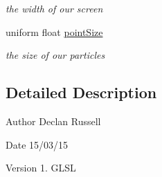 \begin{DoxyCompactItemize}
\begin{DoxyCompactList}\small\item\em the width of our screen \end{DoxyCompactList}\item 
\hypertarget{thickness_vert_8glsl_a9550a4bf60e3039a98ab946ba37ae067}{uniform float \hyperlink{thickness_vert_8glsl_a9550a4bf60e3039a98ab946ba37ae067}{point\-Size}}\label{thickness_vert_8glsl_a9550a4bf60e3039a98ab946ba37ae067}

\begin{DoxyCompactList}\small\item\em the size of our particles \end{DoxyCompactList}\end{DoxyCompactItemize}


\subsection{Detailed Description}
\begin{DoxyAuthor}{Author}
Declan Russell 
\end{DoxyAuthor}
\begin{DoxyDate}{Date}
15/03/15 
\end{DoxyDate}
\begin{DoxyVersion}{Version}
1.  G\-L\-S\-L 
\end{DoxyVersion}
